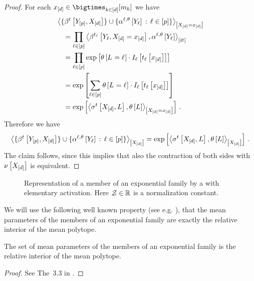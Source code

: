 \begin{proof} %
    For each $\shortcatindicesin$ we have
    \begin{align*}
        &\contractionof{\{\bencsstatwith\}\cup\{\softactlegwith \wcols \selindexin\}}{\indexedshortcatvariables} \\
        &\quad = \prod_{\selindexin} \contraction{\bencodingofat{\sstatcoordinateof{\selindex}}{\headvariableof{\selindex},\indexedshortcatvariables},\softactlegwith} \\
        &\quad = \prod_{\selindexin} \expof{\canparamat{\indexedselvariable}\cdot\indexinterpretationofat{\selindex}{\sstatcoordinateofat{\selindex}{\shortcatindices}}} \\
        &\quad = \expof{\sum_{\selindexin}\canparamat{\indexedselvariable}\cdot\indexinterpretationofat{\selindex}{\sstatcoordinateofat{\selindex}{\shortcatindices}}} \\
        &\quad = \expof{\contractionof{\sencsstatat{\shortcatvariables,\selvariable},\canparamwith}{\indexedshortcatvariables}} \, .
    \end{align*}
    Therefore we have
    \begin{align*}
        \left\langle \{\beta^{t}\left[Y_{[p]},X_{[d]}\right]\}\cup\{\alpha^{\ell,\theta}\left[Y_{\ell}\right] \,:\, \ell\in[p]\}\right\rangle_{\left[ X_{[d]} \right]}
        = \mathrm{exp}\left[\left\langle \sigma^{t}\left[X_{[d]},L\right],\theta\left[L\right]\right\rangle_{\left[ X_{[d]} \right]}\right] \, .
    \end{align*}
    The claim follows, since this implies that also the contraction of both sides with $\nu\left[X_{[d]}\right]$ is equivalent.
\end{proof}

\begin{figure}[t]
    \begin{center}
        
    \end{center}
    \caption{Representation of a member of an exponential family by a \ComputationActivationNetwork{} with elementary activation.
    Here $\mathcal{Z}\in\mathbb{R}$ is a normalization constant.}\label{fig:expdistUnaryRealizable}
\end{figure}

We will use the following well known property (see e.g. \cite{brown_fundamentals_1987}), that the mean parameters of the members of an exponential family are exactly the relative interior of the mean polytope.

\begin{lemma}
    \label{lem:interiorRepExpFamily}
    The set of mean parameters of the members of an exponential family is the relative interior of the mean polytope.
\end{lemma}
\begin{proof}
    See The~3.3 in \cite{wainwright_graphical_2008}.
\end{proof}


